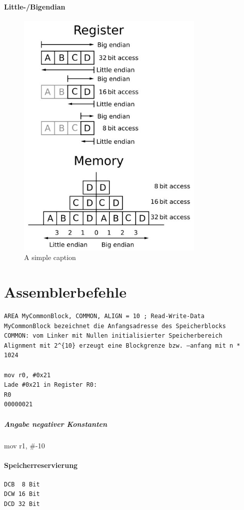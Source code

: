 \documentclass[12pt,twoside,a4paper]{article}
\begin{document}
\paragraph{Little-/Bigendian}
\begin{figure}[ht!]
\centering
\includegraphics[width=90mm]{big-endian_und_little-endian.jpg}
\caption{A simple caption \label{overflow}}
\end{figure}

\section*{Assemblerbefehle}
\begin{lstlisting}
AREA MyCommonBlock, COMMON, ALIGN = 10 ; Read-Write-Data
MyCommonBlock bezeichnet die Anfangsadresse des Speicherblocks
COMMON: vom Linker mit Nullen initialisierter Speicherbereich
Alignment mit 2^{10} erzeugt eine Blockgrenze bzw. –anfang mit n * 1024

mov r0, #0x21
Lade #0x21 in Register R0:
R0
00000021
\end{lstlisting} 

\subparagraph{Angabe negativer Konstanten}
mov r1, #-10

\paragraph{Speicherreservierung}
\begin{lstlisting}
DCB  8 Bit
DCW 16 Bit
DCD 32 Bit
\end{lstlisting}
\end{document}
